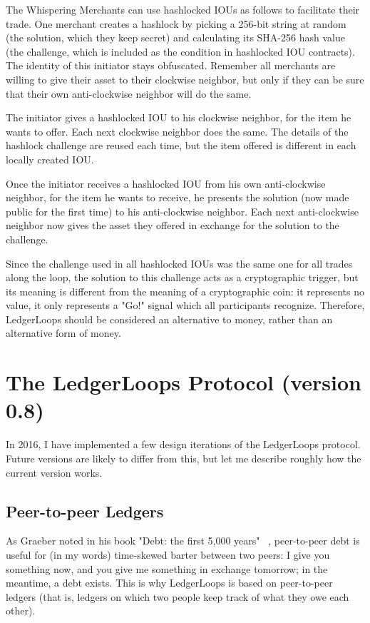 \documentclass[11pt,twoside,a4paper]{article}
\begin{document}
The Whispering Merchants can use hashlocked IOUs as follows to facilitate their trade. One merchant creates a hashlock by picking a 256-bit string at random (the solution, which they keep secret) and calculating its SHA-256 hash value (the challenge, which is included as the condition in hashlocked IOU contracts). The identity of this initiator stays obfuscated. Remember all merchants are willing to give their asset to their clockwise neighbor, but only if they can be sure that their own anti-clockwise neighbor will do the same.

The initiator gives a hashlocked IOU to his clockwise neighbor, for the item he wants to offer. Each next clockwise neighbor does the same. The details of the hashlock challenge are reused each time, but the item offered is different in each locally created IOU.

Once the initiator receives a hashlocked IOU from his own anti-clockwise neighbor, for the item he wants to receive, he presents the solution (now made public for the first time) to his anti-clockwise neighbor. Each next anti-clockwise neighbor now gives the asset they offered in exchange for the solution to the challenge.

Since the challenge used in all hashlocked IOUs was the same one for all trades along the loop, the solution to this challenge acts as a cryptographic trigger, but its meaning is different from the meaning of a cryptographic coin: it represents no value, it only represents a "Go!" signal which all participants recognize. Therefore, LedgerLoops should be considered an alternative to money, rather than an alternative form of money.

\section{The LedgerLoops Protocol (version 0.8)}
In 2016, I have implemented a few design iterations of the LedgerLoops protocol. Future versions are likely to differ from this, but let me describe roughly how the current version works.

\subsection{Peer-to-peer Ledgers}
As Graeber noted in his book "Debt: the first 5,000 years" ~\cite{Graeber2011}, peer-to-peer debt is useful for (in my words) time-skewed barter between two peers: I give you something now, and you give me something in exchange tomorrow; in the meantime, a debt exists. This is why LedgerLoops is based on peer-to-peer ledgers (that is, ledgers on which two people keep track of what they owe each other).
\end{document}
